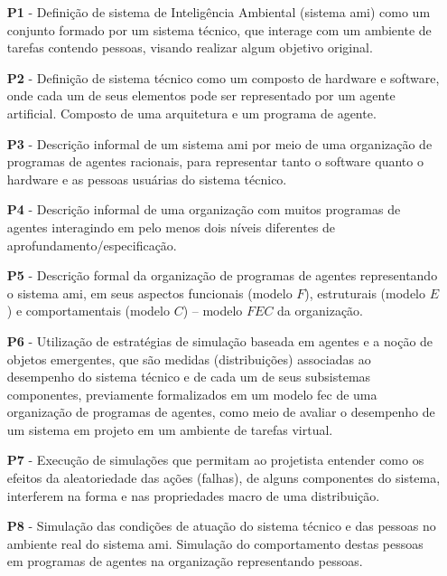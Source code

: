 \begin{itemize}
    \item[\textbf{P1} -] Definição de sistema de Inteligência Ambiental (sistema \acrshort{ami}) como um conjunto formado por um sistema técnico, que interage com um ambiente de tarefas contendo pessoas, visando realizar algum objetivo original.
    
    \item[\textbf{P2} -] Definição de sistema técnico como um composto de hardware e software, onde cada um de seus elementos pode ser representado por um agente artificial. Composto de uma arquitetura e um programa de agente.
    
    \item[\textbf{P3} -] Descrição informal de um sistema \acrshort{ami} por meio de uma organização de programas de agentes racionais, para representar tanto o software quanto o hardware e as pessoas usuárias do sistema técnico. 
    
    \item[\textbf{P4} -] Descrição informal de uma organização com muitos programas de agentes interagindo em pelo menos dois níveis diferentes de aprofundamento/especificação.
    
    \item[\textbf{P5} -] Descrição formal da organização de programas de agentes representando o sistema \acrshort{ami}, em seus aspectos funcionais (modelo $F$), estruturais (modelo $E$) e comportamentais (modelo $C$) – modelo $FEC$ da organização.
    
    \item[\textbf{P6} -] Utilização de estratégias de simulação baseada em agentes e a noção de objetos emergentes, que são medidas (distribuições) associadas ao desempenho do sistema técnico e de cada um de seus subsistemas componentes, previamente formalizados em um modelo \acrshort{fec} de uma organização de programas de agentes, como meio de avaliar o desempenho de um sistema em projeto em um ambiente de tarefas virtual.
    
    \item[\textbf{P7} -] Execução de simulações que permitam ao projetista entender como os efeitos da aleatoriedade das ações (falhas), de alguns componentes do sistema, interferem na forma e nas propriedades macro de uma distribuição.
    
    \item[\textbf{P8} -] Simulação das condições de atuação do sistema técnico e das pessoas no ambiente real do sistema \acrshort{ami}. Simulação do comportamento destas pessoas em programas de agentes na organização representando pessoas.
    

\end{itemize}
